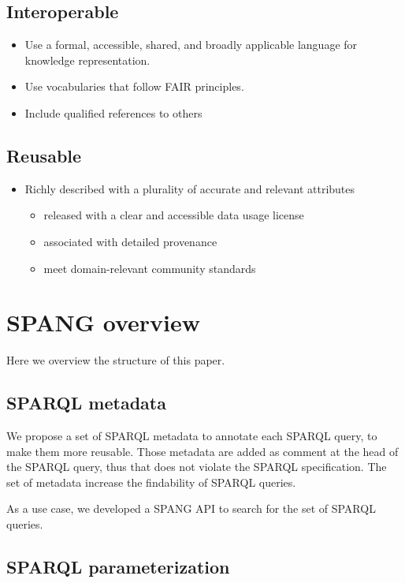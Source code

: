 \documentclass[runningheads]{llncs}
\begin{document}
\subsection{Interoperable}
\begin{itemize}
    \item Use a formal, accessible, shared, and broadly applicable language for knowledge representation.
    \item Use vocabularies that follow FAIR principles.
    \item Include qualified references to others
\end{itemize}

\subsection{Reusable}
\begin{itemize}
    \item Richly described with a plurality of accurate and relevant attributes
    \begin{itemize}
        \item released with a clear and accessible data usage license
        \item associated with detailed provenance
        \item meet domain-relevant community standards
    \end{itemize}
\end{itemize}


\section{SPANG overview}
Here we overview the structure of this paper.

\subsection{SPARQL metadata}

We propose a set of SPARQL metadata to annotate each SPARQL query, to make them more reusable.
Those metadata are added as comment at the head of the SPARQL query, thus that does not violate the SPARQL specification. 
The set of metadata increase the findability of SPARQL queries.

As a use case, we developed a SPANG API to search for the set of SPARQL queries.

\subsection{SPARQL parameterization}
\end{document}
